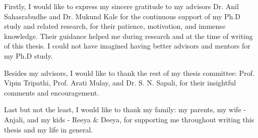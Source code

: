 \begin{acknowledgements}      %
Firstly, I would like to express my sincere gratitude to my advisors Dr. Anil Sahasrabudhe and Dr. Mukund Kale for the continuous support of my Ph.D study and related research, for their patience, motivation, and immense knowledge. Their guidance helped me during research and at the time of writing of this thesis. I could not have imagined having better advisors and mentors for my Ph.D study.

Besides my advisors, I would like to thank the rest of my thesis committee: Prof. Vipin Tripathi, Prof. Arati Mulay, and Dr. S. N. Sapali, for their insightful comments and encouragement.

Last but not the least, I would like to thank my family: my parents, my wife - Anjali, and my kids - Reeya \& Deeya, for supporting me throughout writing this thesis and my life in general.

\end{acknowledgements}
